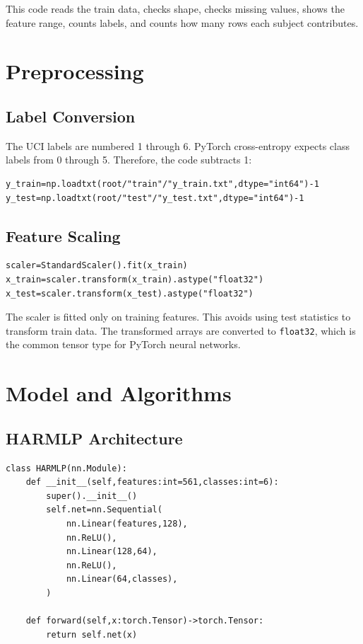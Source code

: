 \documentclass{article}
\begin{document}
This code reads the train data, checks shape, checks missing values, shows the feature range, counts labels, and counts how many rows each subject contributes.

\section{Preprocessing}

\subsection{Label Conversion}
The UCI labels are numbered 1 through 6. PyTorch cross-entropy expects class labels from 0 through 5. Therefore, the code subtracts 1:
\begin{lstlisting}
y_train=np.loadtxt(root/"train"/"y_train.txt",dtype="int64")-1
y_test=np.loadtxt(root/"test"/"y_test.txt",dtype="int64")-1
\end{lstlisting}

\subsection{Feature Scaling}
\begin{lstlisting}
scaler=StandardScaler().fit(x_train)
x_train=scaler.transform(x_train).astype("float32")
x_test=scaler.transform(x_test).astype("float32")
\end{lstlisting}

The scaler is fitted only on training features. This avoids using test statistics to transform train data. The transformed arrays are converted to \texttt{float32}, which is the common tensor type for PyTorch neural networks.

\section{Model and Algorithms}

\subsection{HARMLP Architecture}
\begin{lstlisting}
class HARMLP(nn.Module):
    def __init__(self,features:int=561,classes:int=6):
        super().__init__()
        self.net=nn.Sequential(
            nn.Linear(features,128),
            nn.ReLU(),
            nn.Linear(128,64),
            nn.ReLU(),
            nn.Linear(64,classes),
        )

    def forward(self,x:torch.Tensor)->torch.Tensor:
        return self.net(x)
\end{lstlisting}
\end{document}
